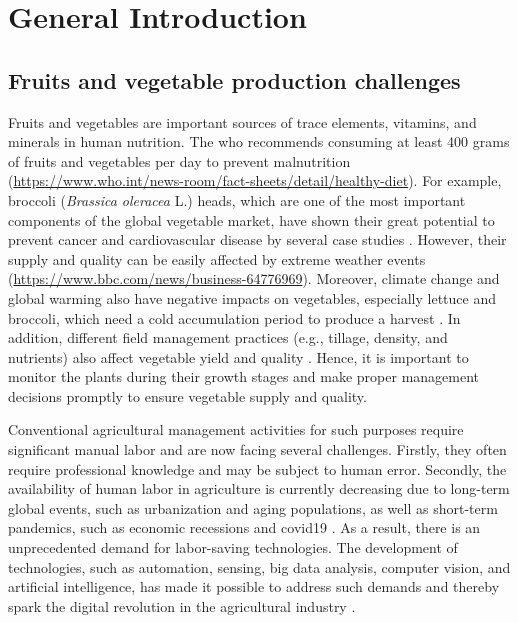 \chapter{General Introduction}

\section{Fruits and vegetable production challenges}

Fruits and vegetables are important sources of trace elements, vitamins, and minerals in human nutrition. The \gls{who} recommends consuming at least 400 grams of fruits and vegetables per day to prevent malnutrition (\url{https://www.who.int/news-room/fact-sheets/detail/healthy-diet}). For example, broccoli (\textit{Brassica oleracea} L.) heads, which are one of the most important components of the global vegetable market, have shown their great potential to prevent cancer and cardiovascular disease by several case studies \citep{mahn_overview_2012,latte_health_2011}. However, their supply and quality can be easily affected by extreme weather events (\url{https://www.bbc.com/news/business-64776969}). Moreover, climate change and global warming also have negative impacts on vegetables, especially lettuce and broccoli, which need a cold accumulation period to produce a harvest \citep{bisbis_potential_2018}. In addition, different field management practices (e.g., tillage, density, and nutrients) also affect vegetable yield and quality \citep{jackson_onfarm_2004, satodiya_effect_2015}. Hence, it is important to monitor the plants during their growth stages and make proper management decisions promptly to ensure vegetable supply and quality.

Conventional agricultural management activities for such purposes require significant manual labor and are now facing several challenges. Firstly, they often require professional knowledge and may be subject to human error. Secondly, the availability of human labor in agriculture is currently decreasing due to long-term global events, such as urbanization and aging populations, as well as short-term pandemics, such as economic recessions and \gls{covid19} \citep{gallardo_adoption_2018, larue_labor_2020}. As a result, there is an unprecedented demand for labor-saving technologies. The development of technologies, such as automation, sensing, big data analysis, computer vision, and artificial intelligence, has made it possible to address such demands and thereby spark the digital revolution in the agricultural industry \citep{gallardo_adoption_2018}.

